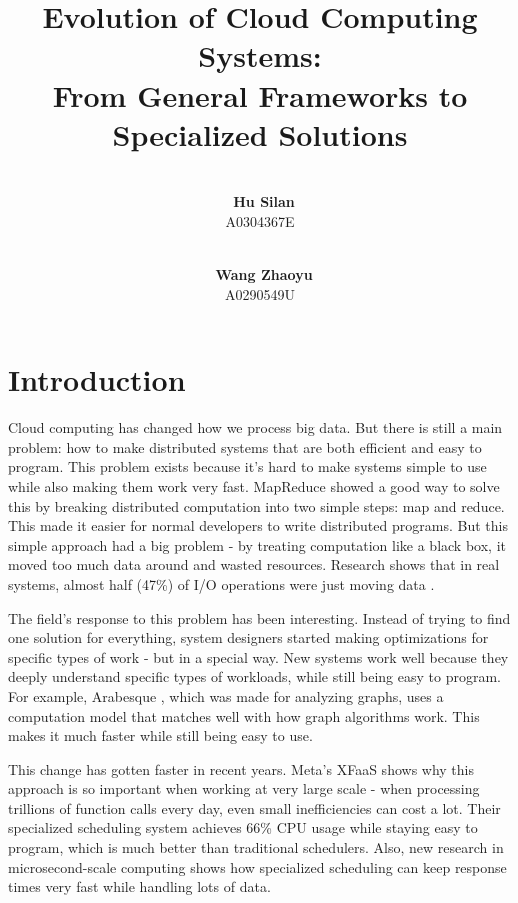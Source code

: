 \documentclass[12pt]{article}
\begin{document}
\title{Evolution of Cloud Computing Systems: \\
From General Frameworks to Specialized Solutions}

\author{\\\textbf{\ Hu Silan}\\A0304367E \and \\\textbf{\ Wang Zhaoyu}\\A0290549U }
\maketitle

\section{Introduction}

Cloud computing has changed how we process big data. But there is still a main problem: how to make distributed systems that are both efficient and easy to program. This problem exists because it's hard to make systems simple to use while also making them work very fast. MapReduce \cite{dean2008mapreduce} showed a good way to solve this by breaking distributed computation into two simple steps: map and reduce. This made it easier for normal developers to write distributed programs. But this simple approach had a big problem - by treating computation like a black box, it moved too much data around and wasted resources. Research shows that in real systems, almost half (47\%) of I/O operations were just moving data \cite{olston2008pig}.

The field's response to this problem has been interesting. Instead of trying to find one solution for everything, system designers started making optimizations for specific types of work - but in a special way. New systems work well because they deeply understand specific types of workloads, while still being easy to program. For example, Arabesque \cite{teixeira2015arabesque}, which was made for analyzing graphs, uses a computation model that matches well with how graph algorithms work. This makes it much faster while still being easy to use.

This change has gotten faster in recent years. Meta's XFaaS \cite{shahrad2020serverless} shows why this approach is so important when working at very large scale - when processing trillions of function calls every day, even small inefficiencies can cost a lot. Their specialized scheduling system achieves 66\% CPU usage while staying easy to program, which is much better than traditional schedulers. Also, new research in microsecond-scale computing \cite{barroso2017attack} shows how specialized scheduling can keep response times very fast while handling lots of data.
\end{document}
